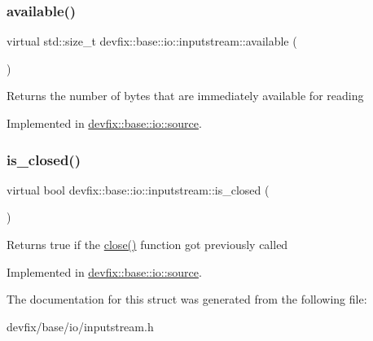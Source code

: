 \subsubsection{\texorpdfstring{available()}{available()}}
{\footnotesize\ttfamily virtual std\+::size\+\_\+t devfix\+::base\+::io\+::inputstream\+::available (\begin{DoxyParamCaption}{ }\end{DoxyParamCaption})\hspace{0.3cm}{\ttfamily [pure virtual]}}

\begin{DoxyReturn}{Returns}
the number of bytes that are immediately available for reading 
\end{DoxyReturn}


Implemented in \hyperlink{structdevfix_1_1base_1_1io_1_1source_a911f4ba79499a623de30cf16d3d26d47}{devfix\+::base\+::io\+::source}.

\mbox{\label{structdevfix_1_1base_1_1io_1_1inputstream_a9da6b400424ff476ed0479193c219fa9}} 
\subsubsection{\texorpdfstring{is\+\_\+closed()}{is\_closed()}}
{\footnotesize\ttfamily virtual bool devfix\+::base\+::io\+::inputstream\+::is\+\_\+closed (\begin{DoxyParamCaption}{ }\end{DoxyParamCaption})\hspace{0.3cm}{\ttfamily [pure virtual]}}

\begin{DoxyReturn}{Returns}
true if the \hyperlink{structdevfix_1_1base_1_1io_1_1inputstream_a1188eff97757eb9625be91dfeca17af7}{close()} function got previously called 
\end{DoxyReturn}


Implemented in \hyperlink{structdevfix_1_1base_1_1io_1_1source_a406834cf6651d48949b96d0ef49cc6c1}{devfix\+::base\+::io\+::source}.



The documentation for this struct was generated from the following file\+:\begin{DoxyCompactItemize}
\item 
devfix/base/io/inputstream.\+h\end{DoxyCompactItemize}
